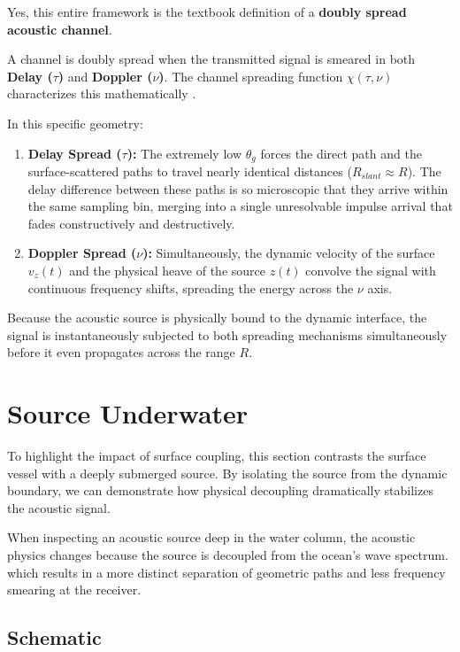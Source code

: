 \documentclass{article}
\begin{document}
Yes, this entire framework is the textbook definition of a \textbf{doubly spread acoustic channel}.

A channel is doubly spread when the transmitted signal is smeared in both \textbf{Delay ($\tau$)} and \textbf{Doppler ($\nu$)}. The channel spreading function $\chi(\tau, \nu)$ characterizes this mathematically \cite{stojanovic1996recent, preisig2007acoustic}.

In this specific geometry:

\begin{enumerate}
    \item \textbf{Delay Spread ($\tau$):} The extremely low $\theta_g$ forces the direct path and the surface-scattered paths to travel nearly identical distances ($R_{slant} \approx R$). The delay difference between these paths is so microscopic that they arrive within the same sampling bin, merging into a single unresolvable impulse arrival that fades constructively and destructively.
    \item \textbf{Doppler Spread ($\nu$):} Simultaneously, the dynamic velocity of the surface $v_z(t)$ and the physical heave of the source $z(t)$ convolve the signal with continuous frequency shifts, spreading the energy across the $\nu$ axis.
\end{enumerate}

Because the acoustic source is physically bound to the dynamic interface, the signal is instantaneously subjected to both spreading mechanisms simultaneously before it even propagates across the range $R$.

\section{Source Underwater}
To highlight the impact of surface coupling, this section contrasts the surface vessel with a deeply submerged source. By isolating the source from the dynamic boundary, we can demonstrate how physical decoupling dramatically stabilizes the acoustic signal.

When inspecting an acoustic source deep in the water column, the acoustic physics changes because the source is decoupled from the ocean's wave spectrum.
which results in a more distinct separation of geometric paths and less frequency smearing at the receiver.

\subsection{Schematic}
\end{document}
